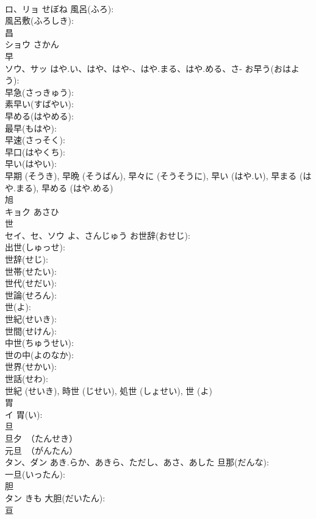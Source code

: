\documentclass[8pt]{extreport}
\begin{document}
\begin{CJK}{UTF8}{min}
\\	ロ、リョ	せぼね	風呂(ふろ): 
\\	風呂敷(ふろしき): 
\\	昌			
\\	ショウ	さかん		
\\	早			
\\	ソウ、サッ	はや.い、はや、はや-、はや.まる、はや.める、さ-	お早う(おはよう): 
\\	早急(さっきゅう): 
\\	素早い(すばやい): 
\\	早める(はやめる): 
\\	最早(もはや): 
\\	早速(さっそく): 
\\	早口(はやくち): 
\\	早い(はやい): 
\\	早期 (そうき), 早晩 (そうばん), 早々に (そうそうに), 早い (はや.い), 早まる (はや.まる), 早める (はや.める)
\\	旭			
\\	キョク	あさひ		
\\	世			
\\	セイ、セ、ソウ	よ、さんじゅう	お世辞(おせじ): 
\\	出世(しゅっせ): 
\\	世辞(せじ): 
\\	世帯(せたい): 
\\	世代(せだい): 
\\	世論(せろん): 
\\	世(よ): 
\\	世紀(せいき): 
\\	世間(せけん): 
\\	中世(ちゅうせい): 
\\	世の中(よのなか): 
\\	世界(せかい): 
\\	世話(せわ): 
\\	世紀 (せいき), 時世 (じせい), 処世 (しょせい), 世 (よ)
\\	胃			
\\	イ		胃(い): 
\\	旦			
\\	旦夕　（たんせき） 
\\	元旦　（がんたん） 
\\	タン、ダン	あき.らか、あきら、ただし、あさ、あした	旦那(だんな): 
\\	一旦(いったん): 
\\	胆			
\\	タン	きも	大胆(だいたん): 
\\	亘			

\end{CJK}
\end{document}
